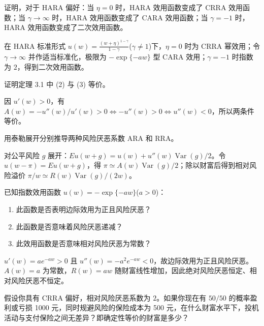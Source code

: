 \begin{problem}
 证明，对于 HARA 偏好：当 $\eta=0$ 时，HARA 效用函数变成了 CRRA 效用函数；当 $\gamma\to\infty$ 时，HARA 效用函数变成了 CARA 效用函数；当 $\gamma=-1$ 时，HARA 效用函数变成了二次效用函数。
\end{problem}
\begin{solution}
在 HARA 标准形式 $u(w)=\frac{(w+\eta)^{1-\gamma}}{1-\gamma}$($\gamma\neq1$)下，$\eta=0$ 时为 CRRA 幂效用；令 $\gamma\to\infty$ 并作适当标准化，极限为 $-\exp\{-aw\}$ 型 CARA 效用；$\gamma=-1$ 时指数为 $2$，得到二次效用函数。
\end{solution}
\begin{problem}
 证明定理 3.1 中 (2) 与 (3) 等价。
\end{problem}
\begin{solution}
因 $u'(w)>0$，有 $A(w)=-u''(w)/u'(w)>0\Leftrightarrow -u''(w)>0\Leftrightarrow u''(w)<0$，所以两条件等价。
\end{solution}
\begin{problem}
 用泰勒展开分别推导两种风险厌恶系数 ARA 和 RRA。
\end{problem}
\begin{solution}
对公平风险 $g$ 展开：$E u(w+g)=u(w)+u''(w)\operatorname{Var}(g)/2$。令 $u(w-\pi)=E u(w+g)$，得 $\pi\simeq A(w)\operatorname{Var}(g)/2$；除以财富后得到相对风险溢价 $\pi/w\simeq R(w)\operatorname{Var}(g)/(2w)$。
\end{solution}
\begin{problem}
 已知指数效用函数 $u(w)=-\exp\{-aw\}$($a>0$)：
\begin{enumerate}[label=(\alph*)]
    \item 此函数是否表明边际效用为正且风险厌恶？
    \item 此函数是否意味着风险厌恶递减？
    \item 此效用函数是否意味相对风险厌恶为常数？
\end{enumerate}
\end{problem}
\begin{solution}
$u'(w)=ae^{-aw}>0$ 且 $u''(w)=-a^2e^{-aw}<0$，故边际效用为正且风险厌恶。$A(w)=a$ 为常数，$R(w)=aw$ 随财富线性增加，因此绝对风险厌恶恒定、相对风险厌恶不恒定。
\end{solution}
\begin{problem}
 假设你具有 CRRA 偏好，相对风险厌恶系数为 $2$。如果你现在有 $50/50$ 的概率盈利或亏损 \num{1000} 元，同时规避风险的保险成本为 \num{500} 元，在什么财富水平下，投机活动与支付保险之间无差异？即确定性等价的财富是多少？
\end{problem}
